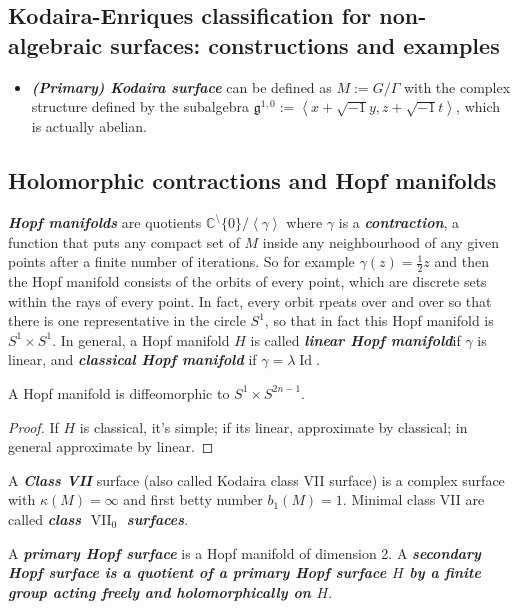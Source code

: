 \subsection{Kodaira-Enriques classification for non-algebraic surfaces: constructions and examples}

\begin{itemize}
\item \textit{\textbf{(Primary) Kodaira surface}} can be defined as \(M:=G/\Gamma\) with the complex structure defined by the subalgebra \(\mathfrak{g}^{1,0}:=\left<x+\sqrt{-1}y,z+\sqrt{-1}t\right>\), which is actually abelian.
\end{itemize}

\subsection{Holomorphic contractions and Hopf manifolds}

\textit{\textbf{Hopf manifolds}} are quotients \(\mathbb{C}^\setminus\{0\}/ \left<\gamma\right>\) where \(\gamma\) is a \textit{\textbf{contraction}}, a function that puts any compact set of \(M\) inside any neighbourhood of any given points after a finite number of iterations. So for example \(\gamma(z)=\frac{1}{2}z\) and then the Hopf manifold consists of the orbits of every point, which are discrete sets within the rays of every point. In fact, every orbit rpeats over and over so that there is one representative in the circle \(S^1\), so that in fact this Hopf manifold is \(S^1 \times S^1\). In general, a Hopf manifold \(H\) is called \textit{\textbf{linear Hopf manifold}}if  \(\gamma\) is linear, and \textit{\textbf{classical Hopf manifold}} if \(\gamma = \lambda \operatorname{Id}\).

\begin{prop}\leavevmode
	A Hopf manifold is diffeomorphic to \(S^1 \times S^{2n-1}\).
\end{prop}

\begin{proof}\leavevmode
If \(H\) is classical, it's simple; if its linear, approximate by classical; in general approximate by linear.
\end{proof}

A \textit{\textbf{Class VII}} surface (also called Kodaira class VII surface) is a complex surface with \(\kappa(M)=\infty\) and first betty number \(b_1(M)=1\). Minimal class VII are called \textit{\textbf{class \(\operatorname{V I I}_0\) surfaces}}.

A \textit{\textbf{primary Hopf surface}} is a Hopf manifold of dimension 2. A \textit{\textbf{secondary Hopf surface is a quotient of a primary Hopf surface \(H\) by a finite group acting freely and holomorphically on \(H\)}}.

